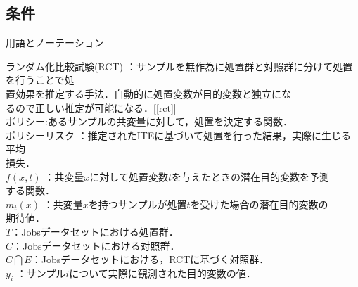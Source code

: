 \documentclass[dvipdfmx]{jreport}
\begin{document}
\subsection{条件} \label{実験条件}
\begin{itembox}[l]{\large{用語とノーテーション}}
    \begin{tabbing}
        \hspace{15pt} \raisebox{0.5ex}{\tiny $\bullet$} ランダム化比較試験(RCT) \=：サンプルを無作為に処置群と対照群に分けて処置を行うことで処\\[0.5em]\>\hspace{6.5pt}置効果を推定する手法．自動的に処置変数が目的変数と独立にな\\[0.5em]\>\hspace{6.5pt}るので正しい推定が可能になる．[\ref{rct}]\\[0.5em]
        \hspace{15pt} \raisebox{0.5ex}{\tiny $\bullet$} ポリシー\>:あるサンプルの共変量に対して，処置を決定する関数．\\[0.5em]
        \hspace{15pt} \raisebox{0.5ex}{\tiny $\bullet$} ポリシーリスク \>：推定されたITEに基づいて処置を行った結果，実際に生じる平均\\[0.5em]\>\hspace{6.5pt}損失．\\[0.5em]
        \hspace{15pt} \raisebox{0.5ex}{\tiny $\bullet$} $f(x, t)$ \> ：共変量$x$に対して処置変数$t$を与えたときの潜在目的変数を予測\\[0.5em]\>\hspace{6.5pt}する関数．\\[0.5em]
        \hspace{15pt} \raisebox{0.5ex}{\tiny $\bullet$} $m_t(x)$ \> ：共変量$x$を持つサンプルが処置$t$を受けた場合の潜在目的変数の\\[0.5em]\>\hspace{6.5pt}期待値．\\[0.5em]
        \hspace{15pt} \raisebox{0.5ex}{\tiny $\bullet$} $T$\>：Jobsデータセットにおける処置群．\\[0.5em]
        \hspace{15pt} \raisebox{0.5ex}{\tiny $\bullet$} $C$\>：Jobsデータセットにおける対照群．\\[0.5em]
        \hspace{15pt} \raisebox{0.5ex}{\tiny $\bullet$} $C \bigcap E$\>：Jobsデータセットにおける，RCTに基づく対照群．\\[0.5em]
        \hspace{15pt} \raisebox{0.5ex}{\tiny $\bullet$} $y_i$ \> ：サンプル$i$について実際に観測された目的変数の値．
    \end{tabbing}
\end{itembox}
\end{document}
